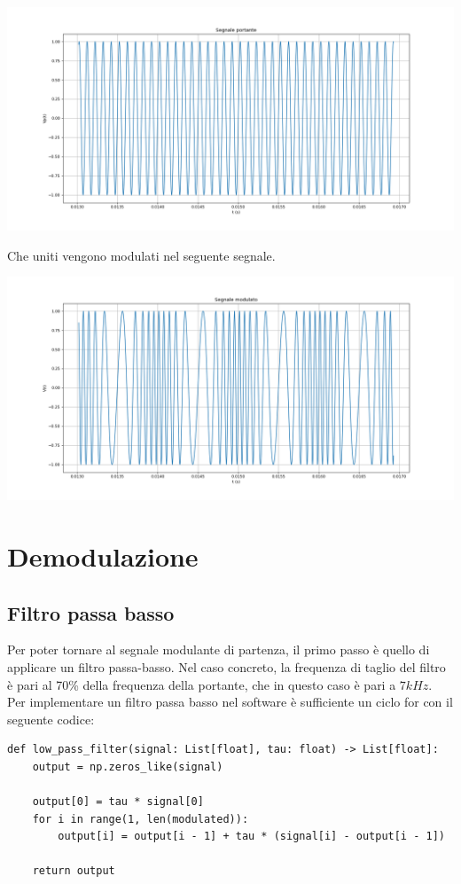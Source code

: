 \documentclass{article}
\begin{document}
\begin{center}
    \includegraphics[width=\textwidth]{portante.png}
\end{center}

\newpage
Che uniti vengono modulati nel seguente segnale.

\begin{center}
    \includegraphics[width=\textwidth]{modulato.png}
\end{center}

\section{Demodulazione}
\subsection{Filtro passa basso}
Per poter tornare al segnale modulante di partenza, il primo passo è quello di applicare un filtro passa-basso.
Nel caso concreto, la frequenza di taglio del filtro è pari al 70\% della frequenza della portante, che in 
questo caso è pari a $7 kHz$.
\\
Per implementare un filtro passa basso nel software è sufficiente un ciclo for con il seguente codice:
\begin{verbatim}
def low_pass_filter(signal: List[float], tau: float) -> List[float]:
    output = np.zeros_like(signal)

    output[0] = tau * signal[0]
    for i in range(1, len(modulated)):
        output[i] = output[i - 1] + tau * (signal[i] - output[i - 1])

    return output
\end{verbatim}
\end{document}
